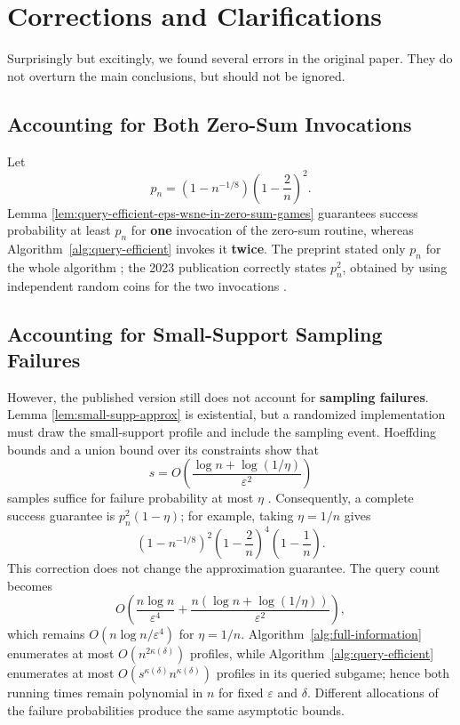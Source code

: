 \section{Corrections and Clarifications}
\label{sec:source-corrections}

Surprisingly but excitingly, we found several errors in the original paper. They do not overturn the main conclusions, but should not be ignored.

\subsection{Accounting for Both Zero-Sum Invocations}

Let
\[
  p_n=\left(1-n^{-1/8}\right)\left(1-\frac{2}{n}\right)^2.
\]
Lemma \ref{lem:query-efficient-eps-wsne-in-zero-sum-games} guarantees success probability at least \(p_n\) for \textbf{one} invocation of the zero-sum routine, whereas Algorithm~\ref{alg:query-efficient} invokes it \textbf{twice}. The preprint stated only \(p_n\) for the whole algorithm \cite[Theorem~2]{12WSNEv1}; the 2023 publication correctly states \(p_n^2\), obtained by using independent random coins for the two invocations \cite[Theorem~2]{12WSNE}.

\subsection{Accounting for Small-Support Sampling Failures}

However, the published version still does not account for \textbf{sampling failures}. Lemma \ref{lem:small-supp-approx} is existential, but a randomized implementation must draw the small-support profile and include the sampling event. Hoeffding bounds and a union bound over its constraints show that
\[
  s=O\!\left(\frac{\log n+\log(1/\eta)}{\varepsilon^2}\right)
\]
samples suffice for failure probability at most \(\eta\) \cite{hoeffding63}. Consequently, a complete success guarantee is \(p_n^2(1-\eta)\); for example, taking \(\eta=1/n\) gives
\[
  \left(1-n^{-1/8}\right)^2
  \left(1-\frac{2}{n}\right)^4
  \left(1-\frac1n\right).
\]
This correction does not change the approximation guarantee. The query count becomes
\[
  O\!\left(
  \frac{n\log n}{\varepsilon^4}
  +\frac{n(\log n+\log(1/\eta))}{\varepsilon^2}
  \right),
\]
which remains \(O(n\log n/\varepsilon^4)\) for \(\eta=1/n\). Algorithm~\ref{alg:full-information} enumerates at most \(O(n^{2\kappa(\delta)})\) profiles, while Algorithm~\ref{alg:query-efficient} enumerates at most \(O(s^{\kappa(\delta)}n^{\kappa(\delta)})\) profiles in its queried subgame; hence both running times remain polynomial in \(n\) for fixed \(\varepsilon\) and \(\delta\). Different allocations of the failure probabilities produce the same asymptotic bounds.

